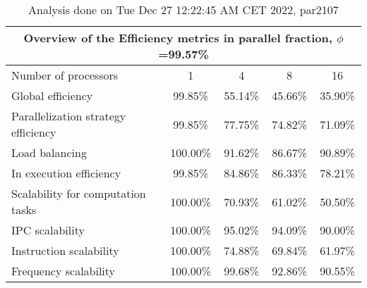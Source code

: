 \begin{table}[h]
\begin{center}
\begin{tabular}{|l|c|c|c|c|}
\hline
\multicolumn{5}{|c|}{Overview of the Efficiency metrics in parallel fraction, $\phi$=99.57\%} \\
\hline
\hline
Number of processors & 1 & 4 & 8 & 16 \\
\hline
\hline
Global efficiency                      &     99.85\% &     55.14\% &     45.66\% &     35.90\% \\
\hline
\hline
Parallelization strategy efficiency &     99.85\% &     77.75\% &     74.82\% &     71.09\% \\
\hline
Load balancing                   &    100.00\% &     91.62\% &     86.67\% &     90.89\% \\
In execution efficiency          &     99.85\% &     84.86\% &     86.33\% &     78.21\% \\
\hline
\hline
Scalability for computation tasks   &    100.00\% &     70.93\% &     61.02\% &     50.50\% \\
\hline
IPC scalability                  &    100.00\% &     95.02\% &     94.09\% &     90.00\% \\
Instruction scalability          &    100.00\% &     74.88\% &     69.84\% &     61.97\% \\
Frequency scalability            &    100.00\% &     99.68\% &     92.86\% &     90.55\% \\
\hline
\end{tabular}
\end{center}
\caption{ Analysis done on Tue Dec 27 12:22:45 AM CET 2022, par2107}
\end{table}
